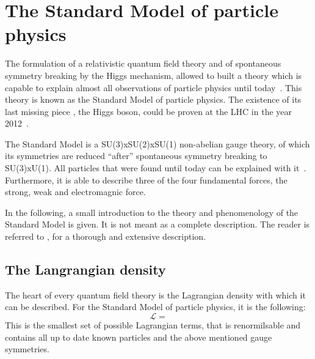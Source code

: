 \chapter{The Standard Model of particle physics}

The formulation of a relativistic quantum field theory and of spontaneous symmetry breaking by the Higgs mechanism, allowed to built a theory which is capable to explain almost all observations of particle physics until today~\cite{FIXME}.
This theory is known as the Standard Model of particle physics.
The existence of its last missing piece 
, the Higgs boson, could be proven at the LHC in the year 2012~\cite{FIXME}.

The Standard Model is a SU(3)xSU(2)xSU(1) non-abelian gauge theory, of which its symmetries are reduced ``after'' spontaneous symmetry breaking to SU(3)xU(1).
All particles that were found until today can be explained with it~\cite{FIXME}.
Furthermore, it is able to describe three of the four fundamental forces, the strong, weak and electromagnic force.

In the following, a small introduction to the theory and phenomenology of the Standard Model is given.
It is not meant as a complete description.
The reader is referred to \cite{FIXME}, for a thorough and extensive description.

\section{The Langrangian density}
The heart of every quantum field theory is the Lagrangian density with which it can be described.
For the Standard Model of particle physics, it is the following:
\begin{equation}
\mathcal{L} = 
\end{equation}
This is the smallest set of possible Lagrangian terms, that is renormilsable and contains all up to date known particles and the above mentioned gauge symmetries.






